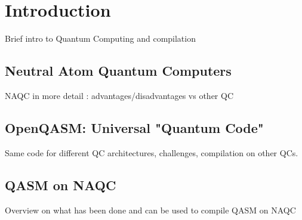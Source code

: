 \section{Introduction}
\label{sec:intro}


Brief intro to Quantum Computing and compilation

\subsection{Neutral Atom Quantum Computers}
\label{sec:NAQC}
NAQC in more detail : advantages/disadvantages vs other QC

\subsection{OpenQASM: Universal "Quantum Code"}
\label{sec:QASM_universal}

Same code for different QC architectures, challenges, compilation on other QCs.

\subsection{QASM on NAQC}
\label{sec:QASM_NAQC}
Overview on what has been done and can be used to compile QASM on NAQC